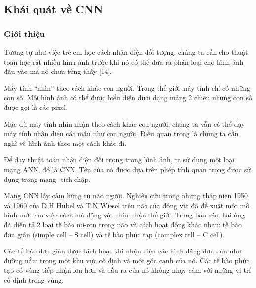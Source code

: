 \setcounter{chapter}{0}
\setcounter{section}{0}
\begin{center}
\chapter{\tenchuongi}
\end{center}

\section{Khái quát về CNN}
\subsection{Giới thiệu}
Tương tự như việc trẻ em học cách nhận diện đối tượng, chúng ta cần cho thuật toán học rất nhiều hình ảnh trước khi nó có thể đưa ra phân loại cho hình ảnh đầu vào mà nó chưa từng thấy [14].



Máy tính “nhìn” theo cách khác con người. Trong thế giới máy tính chỉ có những con số. Mỗi hình ảnh có thể được biểu diễn dưới dạng mảng 2 chiều những con số được gọi là các pixel.

Mặc dù máy tính nhìn nhận theo cách khác con người, chúng ta vẫn có thể dạy máy tính nhận diện các mẫu như con người. Điều quan trọng là chúng ta cần nghĩ về hình ảnh theo một cách khác đi.

Để dạy thuật toán nhận diện đối tượng trong hình ảnh, ta sử dụng một loại mạng ANN, đó là CNN. Tên của nó được dựa trên phép tính quan trọng được sử dụng trong mạng- tích chập.

Mạng CNN lấy cảm hứng từ não người. Nghiên cứu trong những thập niên 1950 và 1960 của D.H Hubel và T.N Wiesel trên não của động vật đã đề xuất một mô hình mới cho việc cách mà động vật nhìn nhận thế giới. Trong báo cáo, hai ông đã diễn tả 2 loại tế bào nơ-ron trong não và cách hoạt động khác nhau: tế bào đơn giản (simple cell – S cell) và tế bào phức tạp (complex cell – C cell). 

Các tế bào đơn giản được kích hoạt khi nhận diện các hình dáng đơn dản như đường nằm trong một khu vực cố định và một góc cạnh của nó. Các tế bào phức tạp có vùng tiếp nhận lơn hơn và đầu ra của nó không nhạy cảm với những vị trí cố định trong vùng. 

